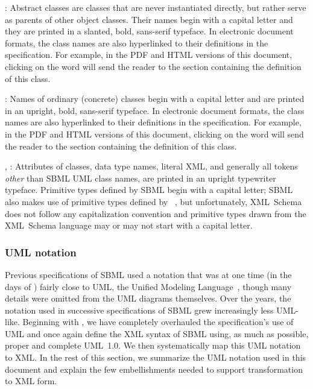 \begin{description}
  
\item {}: Abstract classes are classes
  that are never instantiated directly, but rather serve as
  parents of other object classes.  Their names begin with a
  capital letter and they are printed in a slanted, bold,
  sans-serif typeface.  In electronic document formats, the class
  names are also hyperlinked to their definitions in the
  specification.  For example, in the PDF and HTML versions of
  this document, clicking on the word \SBase will send the reader
  to the section containing the definition of this class.
  
\item {}: Names of ordinary (concrete) classes begin
  with a capital letter and are printed in an upright,
  bold, sans-serif typeface.  In electronic document
  formats, the class names are also hyperlinked to their
  definitions in the specification.  For example, in the PDF and
  HTML versions of this document, clicking on the word \Species
  will send the reader to the section containing the definition of
  this class.

\item {}, : Attributes of
  classes, data type names, literal XML, and generally all tokens
  \emph{other} than SBML UML class names, are printed in an
  upright typewriter typeface.  Primitive types defined by SBML
  begin with a capital letter; SBML also makes use of primitive
  types defined by
  \xmlschemaone~\citep{biron:2000,fallside:2000,thompson:2000},
  but unfortunately, XML~Schema does not follow any capitalization
  convention and primitive types drawn from the XML~Schema
  language may or may not start with a capital letter.

\end{description}


\subsubsection{UML notation}
\label{sec:notation-uml}


Previous specifications of SBML used a notation that was at one
time (in the days of \sbmlone) fairly close to UML, the Unified
Modeling Language~\citep{eriksson:1998,oestereich:1999}, though
many details were omitted from the UML diagrams themselves.  Over
the years, the notation used in successive specifications of SBML
grew increasingly less UML-like.  Beginning with \sbmltwothree, we
have completely overhauled the specification's use of UML and once
again define the XML syntax of SBML using, as much as possible,
proper and complete UML~1.0.  We then systematically map this UML
notation to XML.  In the rest of this section, we summarize the
UML notation used in this document and explain the few
embellishments needed to support transformation to XML form.

